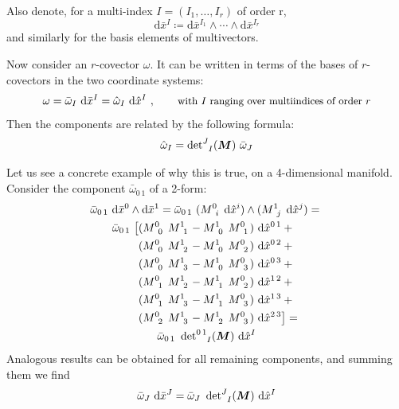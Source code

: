 \documentclass[\ifafour a4paper,12pt,\else a5paper,10pt,\fi%
onecolumn,oneside,article,%
british%
]{memoir}
\theoremstyle{remark}
\theoremstyle{innote}
\newcommand*{\di}{\mathrm{d}}%
\newcommand*{\defd}{\coloneqq}
\renewcommand*{\|}[1][]{\nonscript\,#1\vert\nonscript\;\mathopen{}}
\newcommand*{\hx}{\hat{x}}
\newcommand*{\lx}{\bar{x}}
\renewcommand*{\i}{\indices}
\begin{document}
Also denote, for a multi-index $I = (I_{1}, \dotsc, I_{r})$ of order r,
\begin{equation}
  \label{eq:bases_cov_multitind}
  \di\lx^{I} \defd \di\lx^{I_{1}} \land \dotsb \land \di\lx^{I_{r}}
\end{equation}
and similarly for the basis elements of multivectors.


\bigskip



Now consider an $r$-covector $\omega$. It can be written in terms of the bases
of $r$-covectors in the two coordinate systems:
\begin{align}
  \label{eq:2omega_bases}
  \omega = \bar{\omega}_{I}\ \di \lx^{I} = \hat{\omega}_{I}\ \di\hx^{I} \ ,
  \qquad\text{\small with $I$ ranging over multiindices of order $r$}
\end{align}
Then the components are related by the following formula:
\begin{equation}
  \label{eq:components_multicov_transf}
  \hat{\omega}_{I} = \det\nolimits\i{^{J}_{I}}(\bm{M})\ \bar{\omega}_{J}
\end{equation}

Let us see a concrete example of why this is true, on a 4-dimensional
manifold. Consider the component $\bar{\omega}_{0\,1}$ of a 2-form:
\begin{multline}
  \label{eq:coord_2form_01}
  \bar{\omega}_{0\,1}\ \di\lx^{0} \land \di\lx^{1} =
  \bar{\omega}_{0\,1}\
  (M\i{^{0}_{i}}\ \di\hx^{i}) \land (M\i{^{1}_{j}}\ \di\hx^{j})={}\\
  \bar{\omega}_{0\,1}\ 
  \begin{aligned}[t]
  \bigl[&(M\i{^{0}_{0}}\ M\i{^{1}_{1}} - M\i{^{1}_{0}}\ M\i{^{0}_{1}})\
  \di\hx^{0\,1} +{}\\
  &(M\i{^{0}_{0}}\ M\i{^{1}_{2}} - M\i{^{1}_{0}}\ M\i{^{0}_{2}})\
  \di\hx^{0\,2} +{}\\
  &(M\i{^{0}_{0}}\ M\i{^{1}_{3}} - M\i{^{1}_{0}}\ M\i{^{0}_{3}})\
  \di\hx^{0\,3} +{}\\
  &(M\i{^{0}_{1}}\ M\i{^{1}_{2}} - M\i{^{1}_{1}}\ M\i{^{0}_{2}})\
  \di\hx^{1\,2} +{}\\
  &(M\i{^{0}_{1}}\ M\i{^{1}_{3}} - M\i{^{1}_{1}}\ M\i{^{0}_{3}})\
  \di\hx^{1\,3} +{}\\
  &(M\i{^{0}_{2}}\ M\i{^{1}_{3}} - M\i{^{1}_{2}}\ M\i{^{0}_{3}})\
  \di\hx^{2\,3} \bigr] = {}
\end{aligned}\\
\bar{\omega}_{0\,1}\ \det\nolimits\i{^{0\,1}_{I}}(\bm{M})\ \di\hx^{I}
\end{multline}
Analogous results can be obtained for all remaining components, and summing
them we find
\begin{equation}
  \label{eq:components_multicov_transf_example2}
  \bar{\omega}_{J}\ \di\lx^{J} =
  \bar{\omega}_{J}\ \det\nolimits\i{^{J}_{I}}(\bm{M})\ \di\hx^{I}
\end{equation}
\end{document}
